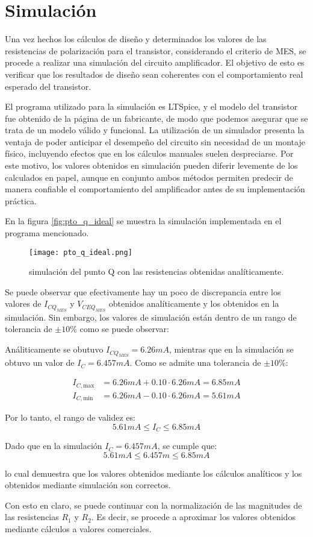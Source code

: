 \section{Simulación}

Una vez hechos los cálculos de diseño y determinados los valores de las resistencias de polarización para el transistor,
considerando el criterio de MES, se procede a realizar una simulación del circuito amplificador. El objetivo de esto es
verificar que los resultados de diseño sean coherentes con el comportamiento real esperado del transistor.

El programa utilizado para la simulación es LTSpice, y el modelo del transistor fue obtenido de la página de un
fabricante, de modo que podemos asegurar que se trata de un modelo válido y funcional. La utilización de un simulador
presenta la ventaja de poder anticipar el desempeño del circuito sin necesidad de un montaje físico, incluyendo
efectos que en los cálculos manuales suelen despreciarse. Por este motivo, los valores obtenidos en simulación pueden
diferir levemente de los calculados en papel, aunque en conjunto ambos métodos permiten predecir de manera confiable el
comportamiento del amplificador antes de su implementación práctica.

En la figura \ref{fig:pto_q_ideal} se muestra la simulación implementada en el programa
mencionado.

\begin{figure}[!ht]
    \centering
    \texttt{[image: pto\_q\_ideal.png]}
    \caption{simulación del punto Q con las resistencias obtenidas analíticamente.}
    \label{fig:placeholder}
\end{figure}

Se puede observar que efectivamente hay un poco de discrepancia entre los valores de
$I_{CQ_{MES}}$ y $V_{CEQ_{MES}}$ obtenidos analíticamente y los obtenidos en la simulación.
Sin embargo, los valores de simulación están dentro de un rango de tolerancia de $\pm10\%$
como se puede observar:

Análiticamente se obutuvo $I_{CQ_{MES}} = 6.26mA$, mientras que en la simulación se obtuvo un valor de $I_C = 6.457mA$.
Como se admite una tolerancia de $\pm 10\%$:

\begin{align*}
I_{C,\text{max}} &= 6.26mA + 0.10 \cdot 6.26mA = 6.85mA \\
I_{C,\text{min}} &= 6.26mA - 0.10 \cdot 6.26mA = 5.61mA
\end{align*}

Por lo tanto, el rango de validez es:
\[
5.61mA \leq I_C \leq 6.85mA
\]

Dado que en la simulación $I_C = 6.457mA$, se cumple que:
\[
5.61mA \leq 6.457m \leq 6.85mA
\]

lo cual demuestra que los valores obtenidos mediante los cálculos analíticos y los 
obtenidos mediante simulación son correctos.

Con esto en claro, se puede continuar con la normalización de las magnitudes
de las resistencias $R_1$ y $R_2$. Es decir, se procede a aproximar los valores obtenidos 
mediante cálculos a valores comerciales.
